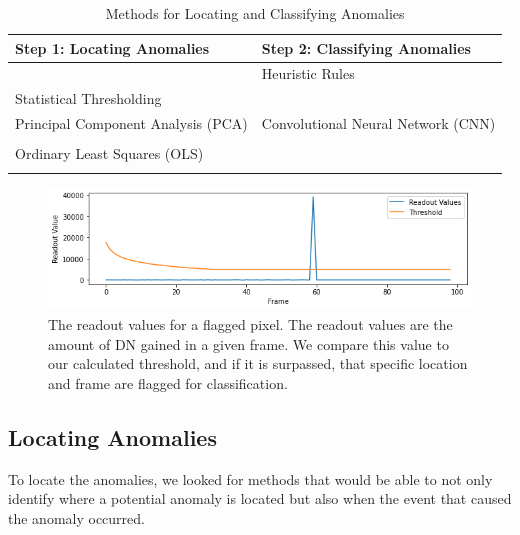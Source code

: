 \begin{table}
    \centering
    \begin{tabular}{|l|l|}
            \hline
        \textbf{Step 1: Locating Anomalies} & \textbf{Step 2: Classifying Anomalies} \\
                \hline
        & Heuristic Rules \\
        Statistical Thresholding& \parencite{cillis2018snowballs} \\
        \hline
        Principal Component Analysis (PCA) & Convolutional Neural Network (CNN)\\
        \parencite{cillis2018snowballs} & \parencite{gu2018recent} \\
        \hline
        Ordinary Least Squares (OLS) & \\
        \parencite{robberto2015cr} & \\
        \hline
    \end{tabular}
    \caption{Methods for Locating and Classifying Anomalies}
    \label{rst/tab:methods}
\end{table}


\begin{figure}[b]
    \centering
    \includegraphics[width=1\linewidth]{figs/rst/Threshold.png}
    \caption[Readout Values Throughout a WFI Detector's Integration]{The readout values for a flagged pixel. The readout values are the amount of DN gained in a given frame. We compare this value to our calculated threshold, and if it is surpassed, that specific location and frame are flagged for classification.}
    \label{rst/fig:threshold}
\end{figure}
\subsection{Locating Anomalies}
To locate the anomalies, we looked for methods that would be able to not only identify where a potential anomaly is located but also when the event that caused the anomaly occurred. 
